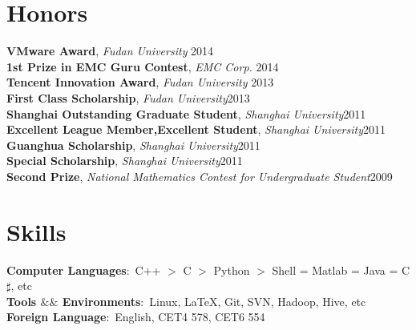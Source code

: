 \documentclass[margin]{res}
\begin{document}
\begin{resume}
\section{Honors}
\textbf{VMware Award}, \emph{Fudan University} \hfill2014\\
\textbf{1st Prize in EMC Guru Contest}, \emph{EMC Corp.} \hfill2014\\
\textbf{Tencent Innovation Award}, \emph{Fudan University} \hfill2013\\
\textbf{First Class Scholarship}, \emph{Fudan University}\hfill2013\\
\textbf{Shanghai Outstanding Graduate Student}, \emph{Shanghai University}\hfill 2011\\
\textbf{Excellent League Member,Excellent Student}, \emph{Shanghai University}\hfill 2011\\
\textbf{Guanghua Scholarship}, \emph{Shanghai University}\hfill 2011\\
\textbf{Special Scholarship}, \emph{Shanghai University}\hfill 2011\\
\textbf{Second Prize}, \emph{National Mathematics Contest for Undergraduate Student}\hfill 2009\\



\section{Skills}
\textbf{Computer Languages}:~C++ $>$ C $>$  Python $>$ Shell = Matlab = Java = C$\sharp$, etc\\
\textbf{Tools $\&\&$ Environments}:~Linux, \LaTeX, Git, SVN, Hadoop, Hive, etc\\
\textbf{Foreign Language}:~English, CET4 578, CET6 554\\







\end{resume}
\end{document}
